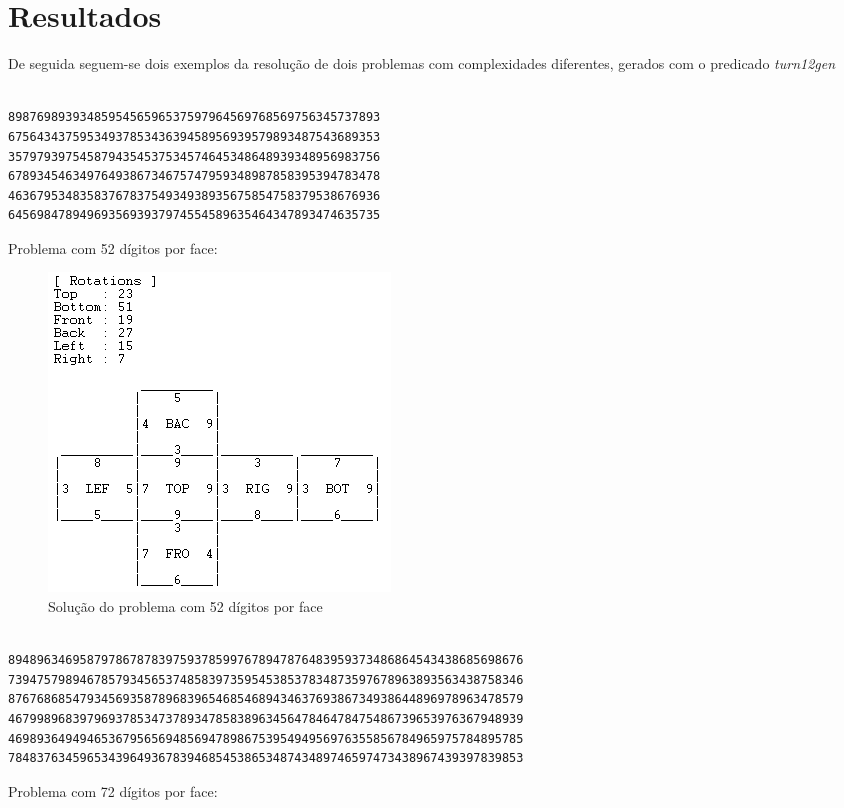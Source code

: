
\section{Resultados}
\label{rest:6}

De seguida seguem-se dois exemplos da resolução de dois problemas com complexidades diferentes, gerados com o predicado \textit{turn12gen}

\begin{f_exemplo}[H]
\begin{verbatim}

8987698939348595456596537597964569768569756345737893
6756434375953493785343639458956939579893487543689353
3579793975458794354537534574645348648939348956983756
6789345463497649386734675747959348987858395394783478
4636795348358376783754934938935675854758379538676936
6456984789496935693937974554589635464347893474635735
\end{verbatim}
\caption{Problema com 52 dígitos por face:}
\end{f_exemplo}

\begin{figure}[H]
\begin{center}
\includegraphics[scale=0.7]{ex1.png}
\caption{Solução do problema com 52 dígitos por face}
\label{fig:4}
\end{center}
\end{figure}

\begin{f_exemplo}[H]
\begin{verbatim}

894896346958797867878397593785997678947876483959373486864543438685698676
739475798946785793456537485839735954538537834873597678963893563438758346
876768685479345693587896839654685468943463769386734938644896978963478579
467998968397969378534737893478583896345647846478475486739653976367948939
469893649494653679565694856947898675395494956976355856784965975784895785
784837634596534396493678394685453865348743489746597473438967439397839853
\end{verbatim}
\caption{Problema com 72 dígitos por face:}
\end{f_exemplo}

